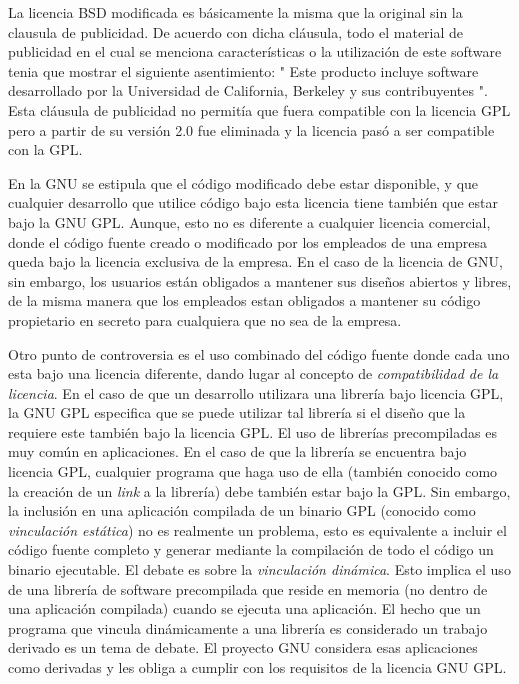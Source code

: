 	La licencia BSD modificada es básicamente la misma que la original sin la clausula de publicidad. De acuerdo con dicha cláusula, todo el material de
	publicidad en el cual se menciona características o la utilización de este software tenia que mostrar el siguiente asentimiento: " Este producto
	incluye software desarrollado por la Universidad de California, Berkeley y sus contribuyentes ". Esta cláusula de publicidad no permitía que fuera
	compatible con la licencia GPL pero a partir de su versión 2.0 fue eliminada y la licencia pasó a ser compatible con la GPL.
	
	En la GNU se estipula que el código modificado debe estar disponible, y que cualquier desarrollo que utilice código bajo esta licencia tiene también
	que estar bajo la GNU GPL. Aunque, esto no es diferente a cualquier licencia comercial, donde el código fuente creado o modificado por los empleados
	de una empresa queda bajo la licencia exclusiva de la empresa. En el caso de la licencia de GNU, sin embargo, los usuarios están obligados a mantener
	sus diseños abiertos y libres, de la misma manera que los empleados estan obligados a mantener su código propietario en secreto para cualquiera que
	no sea de la empresa.
	
	Otro punto de controversia es el uso combinado del código fuente donde cada uno esta bajo una licencia diferente, dando lugar al concepto de
	\textit{compatibilidad de la licencia}. En el caso de que un desarrollo utilizara una librería bajo licencia GPL, la GNU GPL especifica que se puede
	utilizar tal librería si el diseño que la requiere este también bajo la licencia GPL. El uso de librerías precompiladas es muy común en aplicaciones.
	En el caso de que la librería se encuentra bajo licencia GPL, cualquier programa que haga uso de ella (también conocido como la creación de un
	\textit{link} a la librería) debe también estar bajo la GPL. Sin embargo, la inclusión en una aplicación compilada de un binario GPL (conocido como
	\textit{vinculación estática}) no es realmente un problema, esto es equivalente a incluir el código fuente completo y generar mediante la
	compilación de todo el código un binario ejecutable. El debate es sobre la \textit{vinculación dinámica}. Esto implica el uso de una librería de
	software precompilada que reside en memoria (no dentro de una aplicación compilada) cuando se ejecuta una aplicación. El hecho que un programa que 
	vincula dinámicamente a una librería es considerado un trabajo derivado es un tema de debate. El proyecto GNU considera esas aplicaciones como
	derivadas y les obliga a cumplir con los requisitos de la licencia GNU GPL.
	
